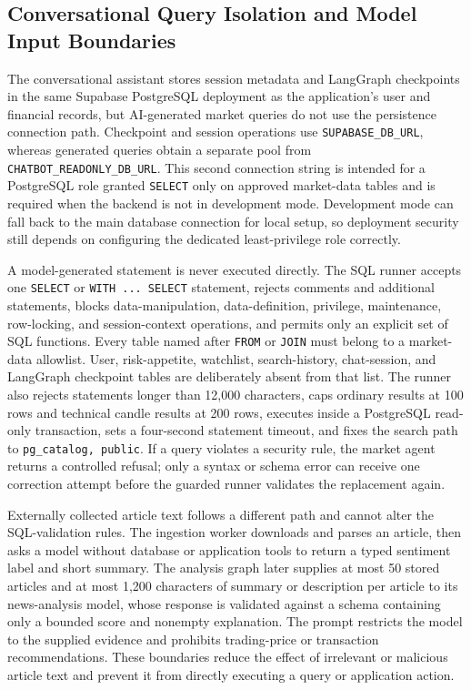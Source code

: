 \subsection{Conversational Query Isolation and Model Input Boundaries}
\label{subsec:chatbot-query-security}

The conversational assistant stores session metadata and LangGraph checkpoints in the same Supabase PostgreSQL deployment as the application's user and financial records, but AI-generated market queries do not use the persistence connection path. Checkpoint and session operations use \texttt{SUPABASE\_DB\_URL}, whereas generated queries obtain a separate pool from \texttt{CHATBOT\_READONLY\_DB\_URL}. This second connection string is intended for a PostgreSQL role granted \texttt{SELECT} only on approved market-data tables and is required when the backend is not in development mode. Development mode can fall back to the main database connection for local setup, so deployment security still depends on configuring the dedicated least-privilege role correctly.

A model-generated statement is never executed directly. The SQL runner accepts one \texttt{SELECT} or \texttt{WITH ... SELECT} statement, rejects comments and additional statements, blocks data-manipulation, data-definition, privilege, maintenance, row-locking, and session-context operations, and permits only an explicit set of SQL functions. Every table named after \texttt{FROM} or \texttt{JOIN} must belong to a market-data allowlist. User, risk-appetite, watchlist, search-history, chat-session, and LangGraph checkpoint tables are deliberately absent from that list. The runner also rejects statements longer than 12,000 characters, caps ordinary results at 100 rows and technical candle results at 200 rows, executes inside a PostgreSQL read-only transaction, sets a four-second statement timeout, and fixes the search path to \texttt{pg\_catalog, public}. If a query violates a security rule, the market agent returns a controlled refusal; only a syntax or schema error can receive one correction attempt before the guarded runner validates the replacement again.

Externally collected article text follows a different path and cannot alter the SQL-validation rules. The ingestion worker downloads and parses an article, then asks a model without database or application tools to return a typed sentiment label and short summary. The analysis graph later supplies at most 50 stored articles and at most 1,200 characters of summary or description per article to its news-analysis model, whose response is validated against a schema containing only a bounded score and nonempty explanation. The prompt restricts the model to the supplied evidence and prohibits trading-price or transaction recommendations. These boundaries reduce the effect of irrelevant or malicious article text and prevent it from directly executing a query or application action.

